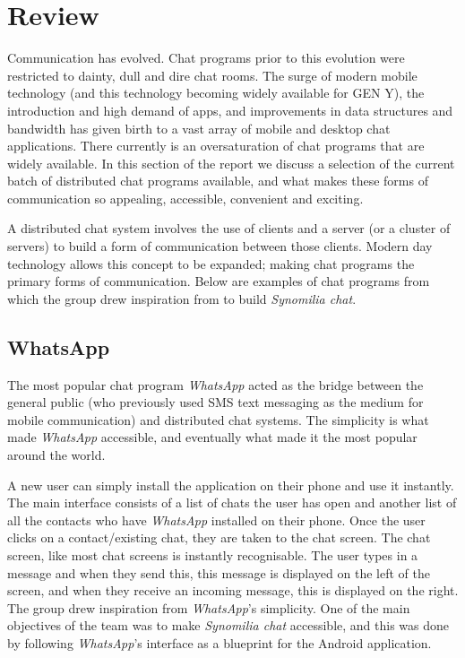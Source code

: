 \documentclass[finalReport.tex]{subfiles}
\begin{document}
\chapter{Review}\label{ch:review}

Communication has evolved. Chat programs prior to this evolution were restricted to dainty, dull and dire chat rooms. The surge of modern mobile technology (and this technology becoming widely available for GEN Y), the introduction and high demand of apps, and improvements in data structures and bandwidth has given birth to a vast array of mobile and desktop chat applications. There currently is an oversaturation of chat programs that are widely available. In this section of the report we discuss a selection of the current batch of distributed chat programs available, and what makes these forms of communication so appealing, accessible, convenient and exciting.

A distributed chat system involves the use of clients and a server (or a cluster of servers) to build a form of communication between those clients. Modern day technology allows this concept to be expanded; making chat programs the primary forms of communication. Below are examples of chat programs from which the group drew inspiration from to build \textit{Synomilia chat}.

\section{WhatsApp}
The most popular chat program \textit{WhatsApp} acted as the bridge between the general public (who previously used SMS text messaging as the medium for mobile communication) and distributed chat systems. The simplicity is what made \textit{WhatsApp} accessible, and eventually what made it the most popular around the world.
 
A new user can simply install the application on their phone and use it instantly. The main interface consists of a list of chats the user has open and another list of all the contacts who have \textit{WhatsApp} installed on their phone. Once the user clicks on a contact/existing chat, they are taken to the chat screen. The chat screen, like most chat screens is instantly recognisable. The user types in a message and when they send this, this message is displayed on the left of the screen, and when they receive an incoming message, this is displayed on the right.
The group drew inspiration from \textit{WhatsApp}’s simplicity. One of the main objectives of the team was to make \textit{Synomilia chat} accessible, and this was done by following \textit{WhatsApp}’s interface as a blueprint for the Android application.
\end{document}
